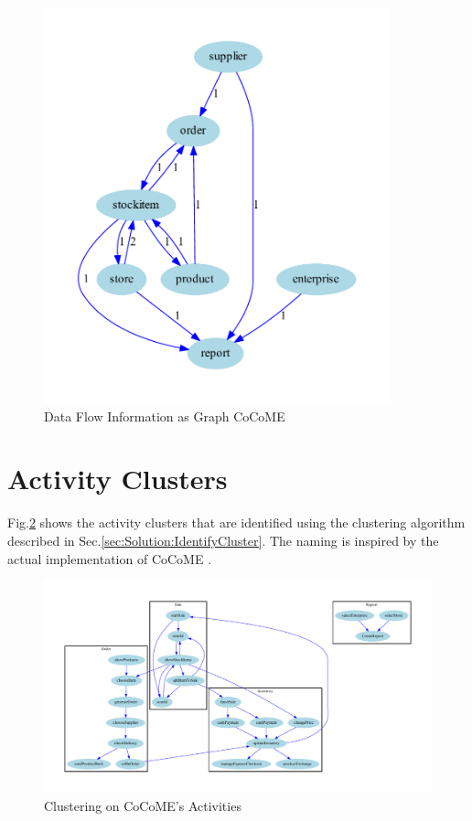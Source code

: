 \begin{figure}[h!]
	\centering
	\includegraphics[width=10cm, trim={1cm 0cm 2cm 0cm}]{img/CoCoMEDataFlowGraph.pdf}
	\caption{Data Flow Information as Graph CoCoME}
	\label{fig:CoCoMEDataFlowGraph}
\end{figure}

\pagebreak

\section{Activity Clusters}
Fig.\ref{fig:CoCoMEActivityCluster} shows the activity clusters that are identified using the clustering algorithm described in Sec.\ref{sec:Solution:IdentifyCluster}. The naming is inspired by the actual implementation of CoCoME \cite{NikoCoCoMEImpl}.

\begin{figure}[h!]
	\centering
	\begin{sideways}
		\includegraphics[width=19.0cm, trim={1.5cm 0cm 1.8cm 0cm}]{img/CoCoMEActivityCluster.pdf}
	\end{sideways}
	
	\caption{Clustering on CoCoME's Activities}
	\label{fig:CoCoMEActivityCluster}
\end{figure}



